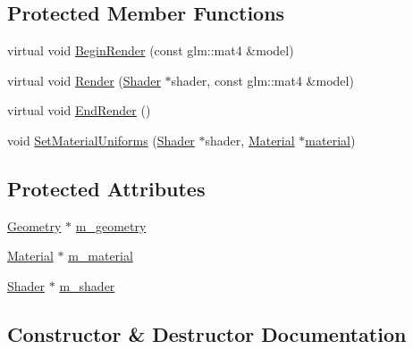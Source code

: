 \subsection*{Protected Member Functions}
\begin{DoxyCompactItemize}
\item 
virtual void \mbox{\hyperlink{classec_1_1_drawable_a5910709a97abc8bbbbd991ccc2c203ff}{Begin\+Render}} (const glm\+::mat4 \&model)
\item 
virtual void \mbox{\hyperlink{classec_1_1_drawable_a133db2c710255113cd357869a1a7912e}{Render}} (\mbox{\hyperlink{classec_1_1_shader}{Shader}} $\ast$shader, const glm\+::mat4 \&model)
\item 
virtual void \mbox{\hyperlink{classec_1_1_drawable_abb7ed19c8b056f10e5b064a5955054b6}{End\+Render}} ()
\item 
void \mbox{\hyperlink{classec_1_1_drawable_afe174a2651c09564efea6f88c7715d96}{Set\+Material\+Uniforms}} (\mbox{\hyperlink{classec_1_1_shader}{Shader}} $\ast$shader, \mbox{\hyperlink{classec_1_1_material}{Material}} $\ast$\mbox{\hyperlink{namespaceec_ae4420ccd0f79418a5ce075e43909289faeec34d804c9ce6c89cff596be555e6a4}{material}})
\end{DoxyCompactItemize}
\subsection*{Protected Attributes}
\begin{DoxyCompactItemize}
\item 
\mbox{\hyperlink{classec_1_1_geometry}{Geometry}} $\ast$ \mbox{\hyperlink{classec_1_1_drawable_a27c423409922385858f1ed89b4e85e70}{m\+\_\+geometry}}
\item 
\mbox{\hyperlink{classec_1_1_material}{Material}} $\ast$ \mbox{\hyperlink{classec_1_1_drawable_ae95da71e937a2008a84300b8d29ac052}{m\+\_\+material}}
\item 
\mbox{\hyperlink{classec_1_1_shader}{Shader}} $\ast$ \mbox{\hyperlink{classec_1_1_drawable_aee71f07b65189391a7a465d880d744e3}{m\+\_\+shader}}
\end{DoxyCompactItemize}


\subsection{Constructor \& Destructor Documentation}
\mbox{\label{classec_1_1_drawable_adb3c4e7b4d3d510489a26b3d1a8094a2}} 
